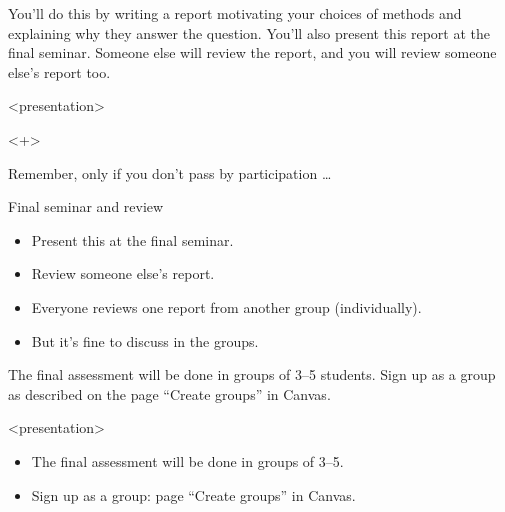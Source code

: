 You'll do this by writing a report motivating your choices of methods and 
explaining why they answer the question.
You'll also present this report at the final seminar.
Someone else will review the report, and you will review someone else's report 
too.

\begin{frame}<presentation>
  \begin{uncoverenv}<+>
  \begin{remark}
    Remember, only if you don't pass by participation \dots
  \end{remark}
  \end{uncoverenv}

  \begin{block}{Final seminar and review}
    \begin{itemize}
      \item Present this at the final seminar.
      \item Review someone else's report.
    \end{itemize}
  \end{block}

  \begin{remark}
    \begin{itemize}
      \item Everyone reviews one report from another group (individually).
      \item But it's fine to discuss in the groups.
    \end{itemize}
  \end{remark}
\end{frame}

The final assessment will be done in groups of 3--5 students.
Sign up as a group as described on the page \enquote{Create groups} in
Canvas.

\begin{frame}<presentation>
  \begin{remark}
    \begin{itemize}
      \item The final assessment will be done in groups of 3--5.
      \item Sign up as a group: page \enquote{Create groups} in Canvas.
    \end{itemize}
  \end{remark}
\end{frame}

